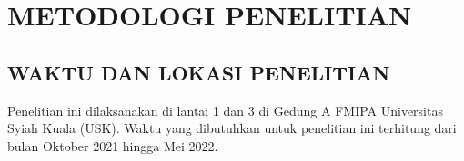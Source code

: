 \fancyhf{}
\fancyfoot[C]{\thepage}
\chapter{METODOLOGI PENELITIAN}

\section{\uppercase{WAKTU DAN LOKASI PENELITIAN}}
\setlength\parindent{30pt} Penelitian ini dilaksanakan di lantai 1 dan 3 di Gedung A FMIPA Universitas Syiah Kuala (USK). Waktu yang dibutuhkan untuk penelitian ini terhitung dari bulan Oktober 2021 hingga Mei 2022.

